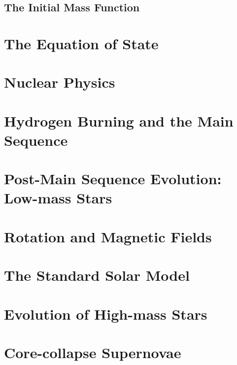 \documentclass{astro-bookshelf}
\begin{document}
\section{The Initial Mass Function}


\chapter[Equation of State]{The Equation of State}\label{ch.equation-of-state}


\chapter{Nuclear Physics}


\chapter[Main Sequence]{Hydrogen Burning and the Main Sequence}


\chapter[Low-Mass Post-Main Sequence]{Post-Main Sequence Evolution: Low-mass Stars}


\chapter[Rotation and Magnetic Fields]{Rotation and Magnetic Fields}\label{ch.rotation}
%

\chapter[Standard Solar Model]{The Standard Solar Model}\label{ch.solarmodel}
%

\chapter[High-mass Stars]{Evolution of High-mass Stars}\label{ch.highmass}
%

\chapter[Core-collapse Supernovae]{Core-collapse Supernovae}\label{ch.ccsn}
%
\end{document}
